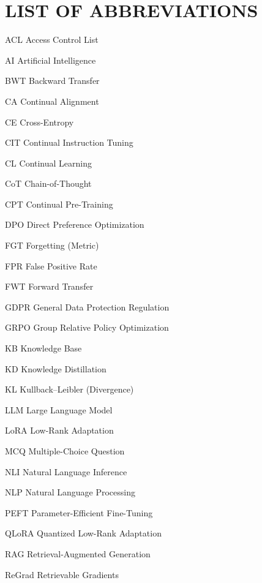 \titleformat{\chapter}{\fontsize{16}{20}\selectfont\bfseries\centering}{\thechapter}{1ex}{\vspace*{-2.5cm}}
\chapter*{LIST OF ABBREVIATIONS}
\begin{abbrv}
	\item[ACL] Access Control List
	\item[AI] Artificial Intelligence
	\item[BWT] Backward Transfer
	\item[CA] Continual Alignment
	\item[CE] Cross-Entropy
	\item[CIT] Continual Instruction Tuning
	\item[CL] Continual Learning
	\item[CoT] Chain-of-Thought
	\item[CPT] Continual Pre-Training
	\item[DPO] Direct Preference Optimization
	\item[FGT] Forgetting (Metric)
	\item[FPR] False Positive Rate
	\item[FWT] Forward Transfer
	\item[GDPR] General Data Protection Regulation
	\item[GRPO] Group Relative Policy Optimization
	\item[KB] Knowledge Base
	\item[KD] Knowledge Distillation
	\item[KL] Kullback--Leibler (Divergence)
	\item[LLM] Large Language Model
	\item[LoRA] Low-Rank Adaptation
	\item[MCQ] Multiple-Choice Question
	\item[NLI] Natural Language Inference
	\item[NLP] Natural Language Processing
	\item[PEFT] Parameter-Efficient Fine-Tuning
	\item[QLoRA] Quantized Low-Rank Adaptation
	\item[RAG] Retrieval-Augmented Generation
	\item[ReGrad] Retrievable Gradients

\end{abbrv}
